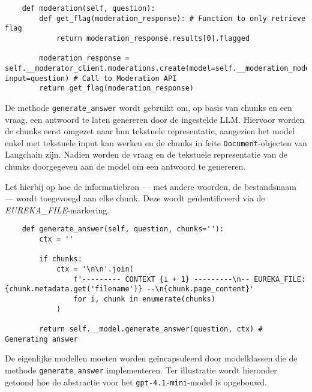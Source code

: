 \begin{verbatim}
    def moderation(self, question):
        def get_flag(moderation_response): # Function to only retrieve flag
            return moderation_response.results[0].flagged
    
        moderation_response = self.__moderator_client.moderations.create(model=self.__moderation_model_name, input=question) # Call to Moderation API
        return get_flag(moderation_response)
\end{verbatim} 

De methode \texttt{generate\_answer} wordt gebruikt om, op basis van chunks en een vraag, een antwoord te laten genereren door de ingestelde \acrshort{LLM}. Hiervoor worden de chunks eerst omgezet naar hun tekstuele representatie, aangezien het model enkel met tekstuele input kan werken en de chunks in feite \texttt{Document}-objecten van Langchain zijn. Nadien worden de vraag en de tekstuele representatie van de chunks doorgegeven aan de model om een antwoord te genereren.

Let hierbij op hoe de informatiebron — met andere woorden, de bestandsnaam — wordt toegevoegd aan elke chunk. Deze wordt geïdentificeerd via de \emph{EUREKA\_FILE}-markering.

\begin{verbatim}
    def generate_answer(self, question, chunks=''):
        ctx = ''
    
        if chunks:
            ctx = '\n\n'.join(
                f'--------- CONTEXT {i + 1} ---------\n-- EUREKA_FILE: {chunk.metadata.get('filename')} --\n{chunk.page_content}'
                for i, chunk in enumerate(chunks)
            )
    
        return self.__model.generate_answer(question, ctx) # Generating answer
\end{verbatim}

De eigenlijke modellen moeten worden geïncapsuleerd door modelklassen die de methode \texttt{generate\_answer} implementeren. Ter illustratie wordt hieronder getoond hoe de abstractie voor het \texttt{gpt-4.1-mini}-model is opgebouwd.


